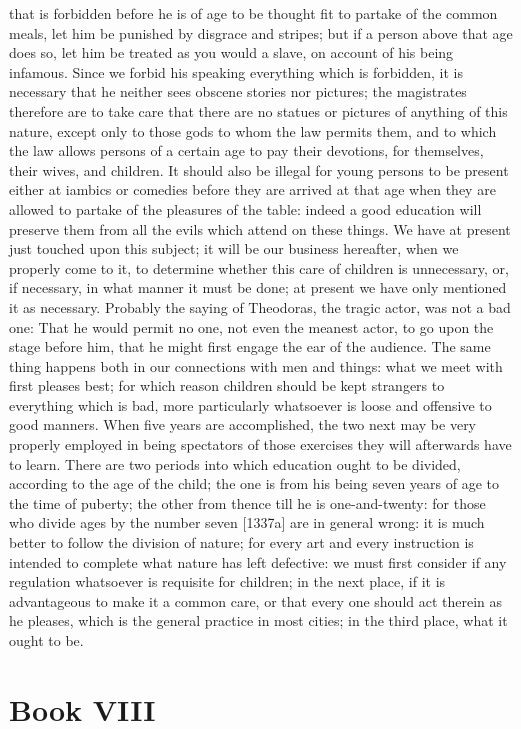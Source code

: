 \documentclass[12pt]{article}
\begin{document}
that is forbidden before he is of age to be thought fit to partake of the common meals, let him be punished by disgrace and stripes; but if a person above that age does so, let him be treated as you would a slave, on account of his being infamous. Since we forbid his speaking everything which is forbidden, it is necessary that he neither sees obscene stories nor pictures; the magistrates therefore are to take care that there are no statues or pictures of anything of this nature, except only to those gods to whom the law permits them, and to which the law allows persons of a certain age to pay their devotions, for themselves, their wives, and children. It should also be illegal for young persons to be present either at iambics or comedies before they are arrived at that age when they are allowed to partake of the pleasures of the table: indeed a good education will preserve them from all the evils which attend on these things. We have at present just touched upon this subject; it will be our business hereafter, when we properly come to it, to determine whether this care of children is unnecessary, or, if necessary, in what manner it must be done; at present we have only mentioned it as necessary. Probably the saying of Theodoras, the tragic actor, was not a bad one: That he would permit no one, not even the meanest actor, to go upon the stage before him, that he might first engage the ear of the audience. The same thing happens both in our connections with men and things: what we meet with first pleases best; for which reason children should be kept strangers to everything which is bad, more particularly whatsoever is loose and offensive to good manners. When five years are accomplished, the two next may be very properly employed in being spectators of those exercises they will afterwards have to learn. There are two periods into which education ought to be divided, according to the age of the child; the one is from his being seven years of age to the time of puberty; the other from thence till he is one-and-twenty: for those who divide ages by the number seven [1337a] are in general wrong: it is much better to follow the division of nature; for every art and every instruction is intended to complete what nature has left defective: we must first consider if any regulation whatsoever is requisite for children; in the next place, if it is advantageous to make it a common care, or that every one should act therein as he pleases, which is the general practice in most cities; in the third place, what it ought to be.

\section*{Book VIII}
\end{document}
